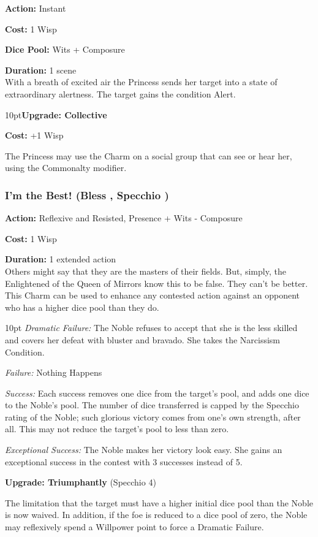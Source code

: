 \noindent \textbf{Action:} Instant

\noindent \textbf{Cost:} 1 Wisp

\noindent \textbf{Dice Pool:} Wits + Composure

\noindent \textbf{Duration:} 1 scene \\

\noindent With a breath of excited air the Princess sends her target into a state of extraordinary alertness. The target gains the condition Alert. 

\begin{myindentpar}{10pt}\textbf{Upgrade: Collective}

\noindent \textbf{Cost:} +1 Wisp

The Princess may use the Charm on a social group that can see or hear her, using the Commonalty modifier. 
\end{myindentpar}

 
\subsubsection*{I'm the Best! (Bless \textbullet, Specchio \textbullet)}

\noindent \textbf{Action:} Reflexive and Resisted, Presence + Wits - Composure 

\noindent \textbf{Cost:} 1 Wisp

\noindent \textbf{Duration:} 1 extended action\\

\noindent Others might say that they are the masters of their fields. But, simply, the Enlightened of the Queen of Mirrors know this to be false. They can’t be better. This Charm can be used to enhance any contested action against an opponent who has a higher dice pool than they do.

\begin{myindentpar}{10pt} \emph{Dramatic Failure:} The Noble refuses to accept that she is the less skilled and covers her defeat with bluster and bravado. She takes the Narcissism Condition.

\emph{Failure:} Nothing Happens 

\emph{Success:}  Each success removes one dice from the target’s pool, and adds one dice to the Noble’s pool. The number of dice transferred is capped by the Specchio rating of the Noble; such glorious victory comes from one’s own strength, after all. This may not reduce the target’s pool to less than zero.

\emph{Exceptional Success:}  The Noble makes her victory look easy. She gains an exceptional success in the contest with 3 successes instead of 5.

\textbf{Upgrade: Triumphantly} (Specchio 4)

The limitation that the target must have a higher initial dice pool than the Noble is now waived. In addition, if the foe is reduced to a dice pool of zero, the Noble may reflexively spend a Willpower point to force a Dramatic Failure.\end{myindentpar}

